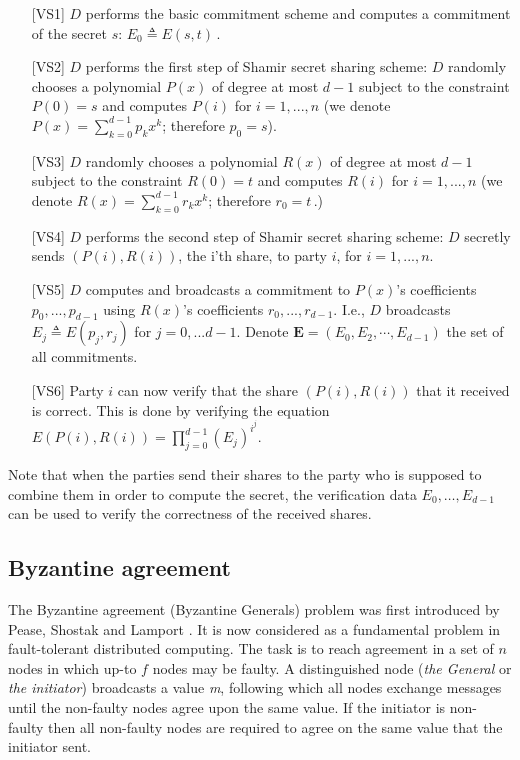 \documentclass[10pt]{svjour3}
\begin{document}
\begin{itemize}
\item [{[VS1]}] $D$ performs the basic commitment scheme and computes a
  commitment of the secret $s$: $E_0 \triangleq E(s,t)\,$.
\item [{[VS2]}] $D$ performs the first step of Shamir secret sharing
  scheme: $D$ randomly chooses a polynomial $P(x)$ of degree at most
  $d-1$ subject to the constraint $P(0) = s$ and computes $P(i)$ for $i=1,...,n$ (we
  denote $P(x)=\sum_{k=0}^{d-1}p_kx^k$; therefore $p_0=s$).
\item [{[VS3]}] $D$ randomly chooses a polynomial $R(x)$ of degree at
  most $d-1$  subject to the constraint
 $R(0) = t$ and computes $R(i)$ for $i=1,...,n$ (we
  denote $R(x)=\sum_{k=0}^{d-1}r_kx^k$; therefore $r_0=t\,$.)
\item [{[VS4]}] $D$ performs the second step of Shamir secret sharing
  scheme: $D$ secretly sends $(P(i), R(i))$, the i'th share, to party
  $i$, for $i=1,...,n$.
\item [{[VS5]}] $D$ computes and broadcasts a commitment to $P(x)$'s
  coefficients
  $p_0,...,p_{d-1}$ using $R(x)$'s coefficients
  $r_0,...,r_{d-1}$. I.e.,  $D$
  broadcasts $E_j \triangleq E(p_j,r_j)$ for $j=0,...d-1$.
 Denote $\mathbf{E} = (E_0, E_2, \cdots, E_{d-1})$ the set of all
 commitments.
\item [{[VS6]}] Party $i$ can now  verify that the  share $(P(i), R(i))$
  that
  it received is correct. This is done by verifying the equation
$E(P(i), R(i)) = \prod_{j=0}^{d-1}(E_j)^{i^j}$.


\end{itemize}
Note that when the parties send their shares to the party who is
supposed to combine them in order to compute the secret, the
verification  data $E_0,\ldots,E_{d-1}$ can  be used
to verify the correctness of the received shares.







\subsection{Byzantine agreement}
\label{agreement}


The Byzantine agreement (Byzantine Generals)
problem was first introduced by Pease, Shostak and Lamport
\cite{Agree80}. It is now considered as a fundamental problem in
fault-tolerant distributed computing. The task is to reach agreement
in a set of $n$ nodes in which up-to $f$ nodes may be faulty. A
distinguished node (\emph{the General} or \emph{the initiator})
broadcasts a value \emph{m}, following which all nodes exchange
messages until the non-faulty nodes agree upon the same value. If
the initiator is non-faulty then all non-faulty nodes are required
to agree on the same value that the initiator sent.
\end{document}
